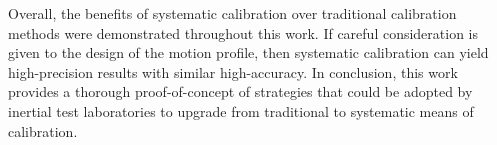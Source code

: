 Overall, the benefits of systematic calibration over traditional calibration methods were demonstrated throughout this work. If careful consideration is given to the design of the motion profile, then systematic calibration can yield high-precision results with similar high-accuracy. In conclusion, this work provides a thorough proof-of-concept of strategies that could be adopted by inertial test laboratories to upgrade from traditional to systematic means of calibration.